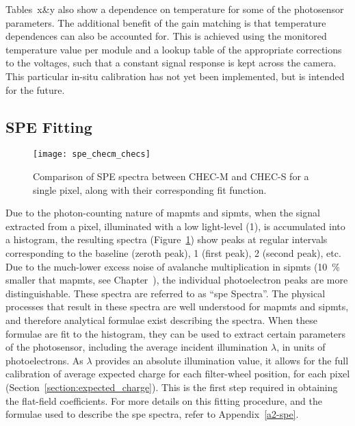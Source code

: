 Tables~x\&y also show a dependence on temperature for some of the photosensor parameters. The additional benefit of the gain matching is that temperature dependences can also be accounted for. This is achieved using the monitored temperature value per module and a lookup table of the appropriate corrections to the voltages, such that a constant signal response is kept across the camera. This particular in-situ calibration has not yet been implemented, but is intended for the future.


\subsection{SPE Fitting}

\begin{figure}
	\centering
    \texttt{[image: spe\_checm\_checs]} 
	\caption[Comparison of SPE spectra between CHEC-M and CHEC-S.]{Comparison of SPE spectra between CHEC-M and CHEC-S for a single pixel, along with their corresponding fit function.} 
	\label{fig:spe_checm_checs}
\end{figure}

Due to the photon-counting nature of \glspl{mapmt} and \glspl{sipmt}, when the signal extracted from a pixel, illuminated with a low light-level (\utilde\SI{1}{\pe}), is accumulated into a histogram, the resulting spectra (Figure~\ref{fig:spe_checm_checs}) show peaks at regular intervals corresponding to the baseline (zeroth peak), \SI{1}{\pe} (first peak), \SI{2}{\pe} (second peak), etc. Due to the much-lower excess noise of avalanche multiplication in \glspl{sipmt} (\SI{10}{\percent} smaller that \glspl{mapmt}, see Chapter~), the individual photoelectron peaks are more distinguishable. These spectra are referred to as ``\gls{spe} Spectra''. The physical processes that result in these spectra are well understood for \glspl{mapmt} and \glspl{sipmt}, and therefore analytical formulae  exist describing the spectra. When these formulae are fit to the histogram, they can be used to extract certain parameters of the photosensor, including the average incident illumination $\lambda$, in units of photoelectrons. As $\lambda$ provides an absolute illumination value, it allows for the full calibration of average expected charge for each filter-wheel position, for each pixel (Section~\ref{section:expected_charge}). This is the first step required in obtaining the flat-field coefficients. For more details on this fitting procedure, and the formulae used to describe the \gls{spe} spectra, refer to Appendix~\ref{a2-spe}.

